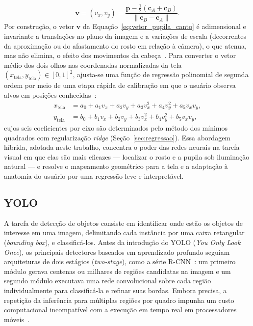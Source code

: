 \begin{enumerate}
    \begin{equation}
        \mathbf{v} = (v_x, v_y) = \frac{\mathbf{p} - \frac{1}{2}(\mathbf{c}_A + \mathbf{c}_B)}{\lVert \mathbf{c}_B - \mathbf{c}_A \rVert}.
        \label{eq:vetor_pupila_canto}
    \end{equation}
    Por construção, o vetor $\mathbf{v}$ da Equação~\ref{eq:vetor_pupila_canto} é adimensional e invariante a translações no plano da imagem e a variações de escala (decorrentes da aproximação ou do afastamento do rosto em relação à câmera), o que atenua, mas não elimina, o efeito dos movimentos da cabeça~\cite{sesma2012evaluation}. Para converter o vetor médio dos dois olhos nas coordenadas normalizadas da tela $(x_{\text{tela}}, y_{\text{tela}}) \in [0, 1]^2$, ajusta-se uma função de regressão polinomial de segunda ordem por meio de uma etapa rápida de calibração em que o usuário observa alvos em posições conhecidas~\cite{hansen2010in,sesma2012evaluation}:
    \begin{equation}
        \begin{aligned}
            x_{\text{tela}} &= a_0 + a_1 v_x + a_2 v_y + a_3 v_x^2 + a_4 v_y^2 + a_5 v_x v_y, \\
            y_{\text{tela}} &= b_0 + b_1 v_x + b_2 v_y + b_3 v_x^2 + b_4 v_y^2 + b_5 v_x v_y,
        \end{aligned}
        \label{eq:regressao_polinomial}
    \end{equation}
    cujos seis coeficientes por eixo são determinados pelo método dos mínimos quadrados com regularização \textit{ridge} (Seção~\ref{sec:regressao}). Essa abordagem híbrida, adotada neste trabalho, concentra o poder das redes neurais na tarefa visual em que elas são mais eficazes --- localizar o rosto e a pupila sob iluminação natural --- e resolve o mapeamento geométrico para a tela e a adaptação à anatomia do usuário por uma regressão leve e interpretável.
\end{enumerate}

\subsection{YOLO} \label{sec:yolo}

A tarefa de detecção de objetos consiste em identificar onde estão os objetos de interesse em uma imagem, delimitando cada instância por uma caixa retangular (\textit{bounding box}), e classificá-los. Antes da introdução do YOLO (\textit{You Only Look Once}), os principais detectores baseados em aprendizado profundo seguiam arquiteturas de dois estágios (\textit{two-stage}), como a série R-CNN~\cite{girshick2014rich}: um primeiro módulo gerava centenas ou milhares de regiões candidatas na imagem e um segundo módulo executava uma rede convolucional sobre cada região individualmente para classificá-la e refinar suas bordas. Embora precisa, a repetição da inferência para múltiplas regiões por quadro impunha um custo computacional incompatível com a execução em tempo real em processadores móveis~\cite{redmon2016yolo}.

